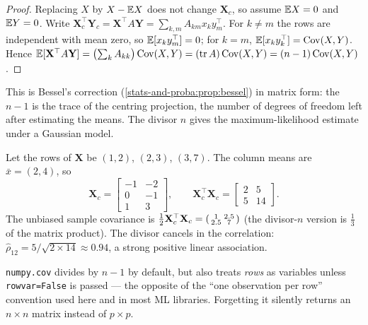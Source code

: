 \begin{notechapter}
\begin{proof}
Replacing $X$ by $X - \mathbb{E} X$ does not change $\mathbf X_c$, so assume $\mathbb{E} X = 0$
and $\mathbb{E} Y = 0$. Write $\mathbf X_c^\top\mathbf Y_c = \mathbf X^\top A\mathbf Y = \sum_{k,m}A_{km}x_ky_m^\top$.
For $k\neq m$ the rows are independent with mean zero, so $\mathbb{E}[x_ky_m^\top] = 0$;
for $k = m$, $\mathbb{E}[x_ky_k^\top] = \operatorname{Cov}(X,Y)$. Hence
$\mathbb{E}[\mathbf X^\top A\mathbf Y] = \bigl(\sum_kA_{kk}\bigr)\operatorname{Cov}(X,Y) = (\operatorname{tr} A)\operatorname{Cov}(X,Y) = (n-1)\operatorname{Cov}(X,Y)$.
\end{proof}

This is Bessel's correction (\cref{stats-and-proba:prop:bessel}) in matrix
form: the $n-1$ is the trace of the centring projection, the number of
degrees of freedom left after estimating the means. The divisor $n$ gives the
maximum-likelihood estimate under a Gaussian model.

\begin{example}\label{covariance-estimation:ex:numeric}
Let the rows of $\mathbf X$ be $(1,2)$, $(2,3)$, $(3,7)$. The column means are
$\bar x = (2,4)$, so
\[
  \mathbf X_c = \begin{bmatrix}-1&-2\\0&-1\\1&3\end{bmatrix},\qquad
  \mathbf X_c^\top\mathbf X_c = \begin{bmatrix}2&5\\5&14\end{bmatrix}.
\]
The unbiased sample covariance is $\frac12\mathbf X_c^\top\mathbf X_c = \begin{psmallmatrix}1&2.5\\2.5&7\end{psmallmatrix}$
(the divisor-$n$ version is $\frac13$ of the matrix product). The divisor cancels
in the correlation: $\hat\rho_{12} = 5/\sqrt{2\times14}\approx0.94$, a strong
positive linear association.
\end{example}

\begin{pitfall}
\texttt{numpy.cov} divides by $n-1$ by default, but also treats \emph{rows} as
variables unless \texttt{rowvar=False} is passed --- the opposite of the
``one observation per row'' convention used here and in most ML libraries.
Forgetting it silently returns an $n\times n$ matrix instead of $p\times p$.
\end{pitfall}


\end{notechapter}
